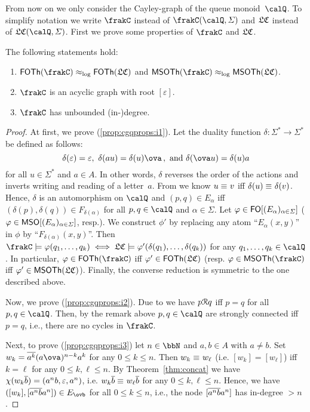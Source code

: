 From now on we only consider the Cayley-graph of the queue monoid~$\Qx$. To simplify notation we write $\cQ$ instead of $\cayley{\Qx}{\varSigma}$ and $\mathfrak{LC}$ instead of $\lcayley{\Qx}{\varSigma}$. First we prove some properties of $\cQ$ and $\mathfrak{LC}$.

\begin{proposition}\label{prop:cgqprops}
	The following statements hold:
	\begin{enumerate}[(1)]
		\item $\FOTh{\cQ}\eqlog\FOTh{\lcQ}$ and $\MSOTh{\cQ}\eqlog\MSOTh{\lcQ}$.\label{prop:cgqprops:i1}
		\item $\cQ$ is an acyclic graph with root $[\varepsilon]$.\label{prop:cgqprops:i2}
		\item $\cQ$ has unbounded (in-)degree.\label{prop:cgqprops:i3}
	\end{enumerate}
\end{proposition}
\begin{proof}
	At first, we prove (\ref{prop:cgqprops:i1}). Let the duality function $\delta\colon\varSigma^*\to\varSigma^*$ be defined as follows:
	\[\delta(\varepsilon)=\varepsilon,\ \delta(au)=\delta(u)\ova\,,\text{ and }\delta(\ova u)=\delta(u)a\]
	for all $u\in\varSigma^*$ and $a\in A$. In other words, $\delta$ reverses the order of the actions and inverts writing and reading of a letter~$a$. From \cite[Proposition~3.4]{HusKZ17} we know $u\equiv_{} v$ iff $\delta(u)\equiv_{}\delta(v)$. Hence, $\delta$ is an automorphism on $\Qx$ and $(p,q)\in E_\alpha$ iff $(\delta(p),\delta(q))\in F_{\delta(\alpha)}$ for all $p,q\in\Qx$ and $\alpha\in\varSigma$. Let $\varphi\in\mathsf{FO}[(E_\alpha)_{\alpha\in\varSigma}]$ ($\varphi\in\mathsf{MSO}[(E_\alpha)_{\alpha\in\varSigma}]$, resp.). We construct $\phi'$ by replacing any atom ``$E_\alpha(x,y)$'' in $\phi$ by ``$F_{\delta(\alpha)}(x,y)$''. Then
	$\cQ\models\phi(q_1,\dots,q_k) \iff \lcQ\models\phi'(\delta(q_1),\dots,\delta(q_k))$ for any $q_1,\dots,q_k\in\Qx$. In particular, $\phi\in\FOTh{\cQ}$ iff $\varphi'\in\mathsf{FOTh}(\mathfrak{LC})$ (resp. $\phi\in\MSOTh{\cQ}$ iff $\varphi'\in\mathsf{MSOTh}(\mathfrak{LC})$). Finally, the converse reduction is symmetric to the one described above.
	
	Now, we prove (\ref{prop:cgqprops:i2}). Due to \cite[Corollary~4.7]{HusKZ17} we have $p\mathcal{R} q$ iff $p=q$ for all $p,q\in\Qx$. Then, by the remark above $p,q\in\Qx$ are strongly connected iff $p=q$, i.e., there are no cycles in $\cQ$.
	
	Next, to prove (\ref{prop:cgqprops:i3}) let $n\in\bbN$ and $a,b\in A$ with $a\neq b$. Set $w_k=\ov{a^k}(a\ova)^{n-k}a^k$ for any $0\leq k\leq n$. Then $w_k\equiv_{} w_\ell$ (i.e. $[w_k]=[w_\ell]$) iff $k=\ell$ for any $0\leq k,\ell\leq n$. By Theorem~\ref{thm:concat} we have $\chi(w_k\overline{b})=(a^nb,\varepsilon,a^n)$, i.e. $w_k\overline{b}\equiv_{} w_\ell\overline{b}$ for any $0\leq k,\ell\leq n$. Hence, we have $([w_k],[\ov{a^nb}a^n])\in E_{\ovb}$ for all $0\leq k\leq n$, i.e., the node $[\overline{a^nb}a^n]$ has in-degree $>n$.
\end{proof}

